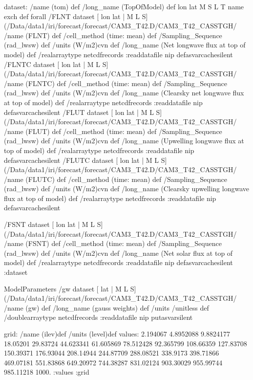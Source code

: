 \begin{ingrid}
dataset:
/name (tom) def
/long_name (TopOfModel) def
{ lon lat M S L T } { name exch def} forall
 /FLNT{
dataset
[ lon lat | M L S] (/Data/data1/iri/forecast/forecast/CAM3_T42.D/CAM3_T42_CASSTGH/%
/name (FLNT) def
 /cell_method (time: mean) def
 /Sampling_Sequence (rad_lwsw) def
 /units (W/m2)cvn def
 /long_name (Net longwave flux at top of model) def
 /realarraytype netcdfrecords :readdatafile
nip
}defasvarcachesilent
 /FLNTC{
dataset
[ lon lat | M L S] (/Data/data1/iri/forecast/forecast/CAM3_T42.D/CAM3_T42_CASSTGH/%
/name (FLNTC) def
 /cell_method (time: mean) def
 /Sampling_Sequence (rad_lwsw) def
 /units (W/m2)cvn def
 /long_name (Clearsky net longwave flux at top of model) def
 /realarraytype netcdfrecords :readdatafile
nip
}defasvarcachesilent
 /FLUT{
dataset
[ lon lat | M L S] (/Data/data1/iri/forecast/forecast/CAM3_T42.D/CAM3_T42_CASSTGH/%
/name (FLUT) def
 /cell_method (time: mean) def
 /Sampling_Sequence (rad_lwsw) def
 /units (W/m2)cvn def
 /long_name (Upwelling longwave flux at top of model) def
 /realarraytype netcdfrecords :readdatafile
nip
}defasvarcachesilent
 /FLUTC{
dataset
[ lon lat | M L S] (/Data/data1/iri/forecast/forecast/CAM3_T42.D/CAM3_T42_CASSTGH/%
/name (FLUTC) def
 /cell_method (time: mean) def
 /Sampling_Sequence (rad_lwsw) def
 /units (W/m2)cvn def
 /long_name (Clearsky upwelling longwave flux at top of model) def
 /realarraytype netcdfrecords :readdatafile
nip
}defasvarcachesilent


 /FSNT{
dataset
[ lon lat | M L S] (/Data/data1/iri/forecast/forecast/CAM3_T42.D/CAM3_T42_CASSTGH/%
/name (FSNT) def
 /cell_method (time: mean) def
 /Sampling_Sequence (rad_lwsw) def
 /units (W/m2)cvn def
 /long_name (Net solar flux at top of model) def
 /realarraytype netcdfrecords :readdatafile
nip
}defasvarcachesilent
:dataset

ModelParameters /gw{
dataset
[ lat | M L S] (/Data/data1/iri/forecast/forecast/CAM3_T42.D/CAM3_T42_CASSTGH/%
/name (gw) def
 /long_name (gauss weights) def
 /units /unitless def
 /doublearraytype netcdfrecords :readdatafile
nip
}putasvarsilent

grid:
/name (ilev)def
/units (level)def
values: 2.194067 4.8952088 9.8824177 18.05201 29.83724 44.623341 61.605869 78.512428 92.365799 108.66359 127.83708 150.39371 176.93044 208.14944 244.87709 288.08521 338.9173 398.71866 469.07181 551.83868 649.20972 744.38287 831.02124 903.30029 955.99744 985.11218 1000. :values
:grid


\end{ingrid}

